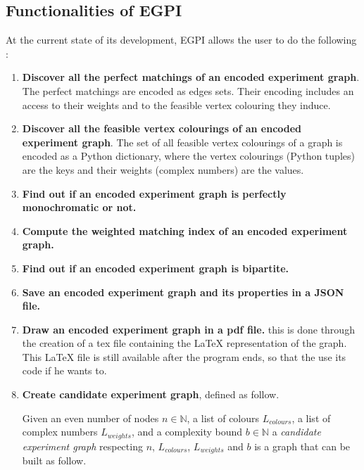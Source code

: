\subsection{Functionalities of EGPI}

At the current state of its development, EGPI allows the user to do the following :

\begin{enumerate}
    \item \textbf{Discover all the perfect matchings of an encoded experiment graph}. The perfect matchings are encoded as edges sets. Their encoding includes an access to their weights and to the feasible vertex colouring they induce.
    \item \textbf{Discover all the feasible vertex colourings of an encoded experiment graph}. The set of all feasible vertex colourings of a graph is encoded as a Python dictionary, where the vertex colourings (Python tuples) are the keys and their weights (complex numbers) are the values.
    \item \textbf{Find out if an encoded experiment graph is perfectly monochromatic or not.}
    \item \textbf{Compute the weighted matching index of an encoded experiment graph.}
    \item \textbf{Find out if an encoded experiment graph is bipartite.}
    \item \textbf{Save an encoded experiment graph and its properties in a JSON file.}
    \item \textbf{Draw an encoded experiment graph in a pdf file.} this is done through the creation of a tex file containing the LaTeX representation of the graph. This LaTeX file is still available after the program ends, so that the use its code if he wants to.
    \item \textbf{Create candidate experiment graph}, defined as follow.
    \begin{definition}
        \label{def:candidate_experiment_graph}
        Given an even number of nodes $n \in \mathbb{N}$, a list of colours $L_{colours}$, a list of complex numbers $L_{weights}$, and a complexity bound $b \in \mathbb{N}$ a \textit{candidate experiment graph} respecting $n$, $L_{colours}$, $L_{weights}$ and $b$ is a graph that can be built as follow.


\end{definition}
\end{enumerate}
